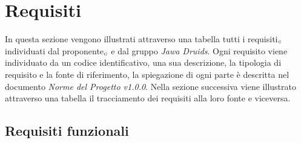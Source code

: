 \chapter{Requisiti}\label{Requisiti}
In questa sezione vengono illustrati attraverso una tabella tutti i requisiti$_{\scaleto{G}{3pt}}$ individuati dal proponente$_{\scaleto{G}{3pt}}$ e dal gruppo \textit{Jawa Druids}. Ogni requisito viene individuato da un codice identificativo, una sua descrizione, la tipologia di requisito e la fonte di riferimento, la spiegazione di ogni parte è descritta nel documento \textit{Norme del Progetto v1.0.0}. Nella sezione successiva viene illustrato attraverso una tabella il tracciamento dei requisiti alla loro fonte e viceversa.
\section{Requisiti funzionali}\label{RequisitiFunzionali}

